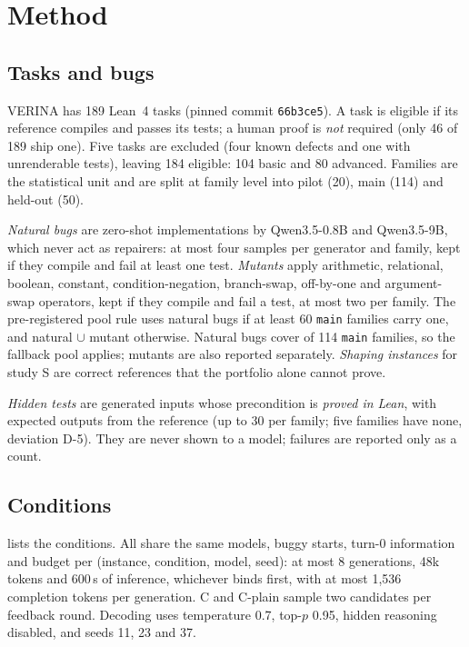 \documentclass[10pt,twocolumn]{article}
\begin{document}
\section{Method}

\subsection{Tasks and bugs}
VERINA has 189 Lean~4 tasks (pinned commit \texttt{66b3ce5}). A task is eligible if its reference compiles and
passes its tests; a human proof is \emph{not} required (only 46 of 189 ship one). Five tasks are excluded
(four known defects and one with unrenderable tests), leaving 184 eligible: 104 basic and 80 advanced.
Families are the statistical unit and are split at family level into pilot (20), main (114) and held-out (50).

\emph{Natural bugs} are zero-shot implementations by Qwen3.5-0.8B and Qwen3.5-9B, which never act as
repairers: at most four samples per generator and family, kept if they compile and fail at least one test.
\emph{Mutants} apply arithmetic, relational, boolean, constant, condition-negation, branch-swap, off-by-one and
argument-swap operators, kept if they compile and fail a test, at most two per family. The pre-registered pool
rule uses natural bugs if at least 60 \texttt{main} families carry one, and natural $\cup$ mutant otherwise.
Natural bugs cover \resNaturalFamilies{} of 114 \texttt{main} families, so the fallback pool applies; mutants are also reported
separately. \emph{Shaping instances} for study S are correct references that the portfolio alone cannot prove.

\emph{Hidden tests} are generated inputs whose precondition is \emph{proved in Lean}, with expected outputs from
the reference (up to 30 per family; five families have none, deviation D-5). They are never shown to a model; failures are reported only as a count.

\subsection{Conditions}
 lists the conditions. All share the same models, buggy starts, turn-0 information and
budget per (instance, condition, model, seed): at most 8 generations, 48k tokens and 600\,s of inference,
whichever binds first, with at most 1,536 completion tokens per generation. C and C-plain sample two
candidates per feedback round. Decoding uses temperature 0.7, top-$p$ 0.95, hidden reasoning disabled, and
seeds 11, 23 and 37.
\end{document}
